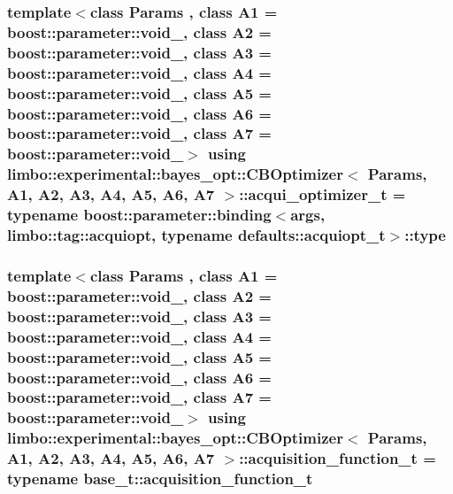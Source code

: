 \subsubsection[{acqui\+\_\+optimizer\+\_\+t}]{\setlength{\rightskip}{0pt plus 5cm}template$<$class Params , class A1  = boost\+::parameter\+::void\+\_\+, class A2  = boost\+::parameter\+::void\+\_\+, class A3  = boost\+::parameter\+::void\+\_\+, class A4  = boost\+::parameter\+::void\+\_\+, class A5  = boost\+::parameter\+::void\+\_\+, class A6  = boost\+::parameter\+::void\+\_\+, class A7  = boost\+::parameter\+::void\+\_\+$>$ using {\bf limbo\+::experimental\+::bayes\+\_\+opt\+::\+C\+B\+Optimizer}$<$ Params, A1, A2, A3, A4, A5, A6, A7 $>$\+::{\bf acqui\+\_\+optimizer\+\_\+t} =  typename boost\+::parameter\+::binding$<${\bf args}, limbo\+::tag\+::acquiopt, typename {\bf defaults\+::acquiopt\+\_\+t}$>$\+::type}\label{classlimbo_1_1experimental_1_1bayes__opt_1_1_c_b_optimizer_aa3b86d243d0d118a1c2f39bb00663c80}
\hypertarget{classlimbo_1_1experimental_1_1bayes__opt_1_1_c_b_optimizer_a3bef2b5e755af502e47a669dce9398f9}{}
\subsubsection[{acquisition\+\_\+function\+\_\+t}]{\setlength{\rightskip}{0pt plus 5cm}template$<$class Params , class A1  = boost\+::parameter\+::void\+\_\+, class A2  = boost\+::parameter\+::void\+\_\+, class A3  = boost\+::parameter\+::void\+\_\+, class A4  = boost\+::parameter\+::void\+\_\+, class A5  = boost\+::parameter\+::void\+\_\+, class A6  = boost\+::parameter\+::void\+\_\+, class A7  = boost\+::parameter\+::void\+\_\+$>$ using {\bf limbo\+::experimental\+::bayes\+\_\+opt\+::\+C\+B\+Optimizer}$<$ Params, A1, A2, A3, A4, A5, A6, A7 $>$\+::{\bf acquisition\+\_\+function\+\_\+t} =  typename {\bf base\+\_\+t\+::acquisition\+\_\+function\+\_\+t}}\label{classlimbo_1_1experimental_1_1bayes__opt_1_1_c_b_optimizer_a3bef2b5e755af502e47a669dce9398f9}
\hypertarget{classlimbo_1_1experimental_1_1bayes__opt_1_1_c_b_optimizer_a0b62d16abcb5eec9dbd4b37222137c26}{}
